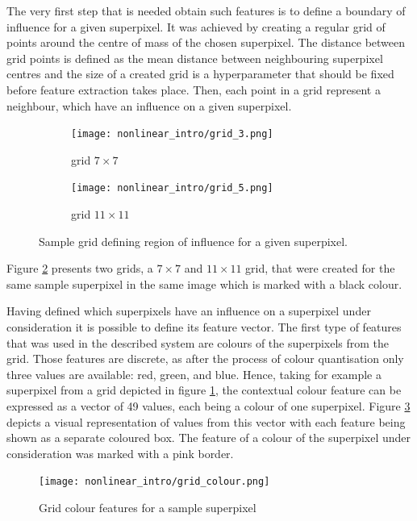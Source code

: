 The very first step that is needed obtain such features is to define a boundary of influence for a given superpixel. It was achieved by creating a regular grid of points around the centre of mass of the chosen superpixel. The distance between grid points is defined as the mean distance between neighbouring superpixel centres and the size of a created grid is a hyperparameter that should be fixed before feature extraction takes place. Then, each point in a grid represent a neighbour, which have an influence on a given superpixel.
\begin{figure}[ht]
    \centering
    \begin{subfigure}[h]{0.40\textwidth}
        \texttt{[image: nonlinear\_intro/grid\_3.png]}
        \caption{grid $7 \times 7$}
        \label{fig:grid_7_7}
      \end{subfigure}
    \begin{subfigure}[h]{0.40\textwidth}
        \texttt{[image: nonlinear\_intro/grid\_5.png]}
        \caption{grid $11 \times 11$}
      \end{subfigure}
    \caption{Sample grid defining region of influence for a given superpixel.}
    \label{fig:nonlinear_grid}
\end{figure}
 Figure \ref{fig:nonlinear_grid} presents two grids, a $7 \times 7$ and $11 \times 11$ grid, that were created for the same sample superpixel in the same image which is marked with a black colour.

Having defined which superpixels have an influence on a superpixel under consideration it is possible to define its feature vector. The first type of features that was used in the described system are colours of the superpixels from the grid. Those features are discrete, as after the process of colour quantisation only three values are available: red, green, and blue. Hence, taking for example a superpixel from a grid depicted in figure \ref{fig:grid_7_7}, the contextual colour feature can be expressed as a vector of 49 values, each being a colour of one superpixel. Figure \ref{fig:grid_colour} depicts a visual representation of values from this vector with each feature being shown as a separate coloured box. The feature of a colour of the superpixel under consideration was marked with a pink border.
\begin{figure}[ht]
    \centering
    \texttt{[image: nonlinear\_intro/grid\_colour.png]}
    \caption{Grid colour features for a sample superpixel}
    \label{fig:grid_colour}
\end{figure}

